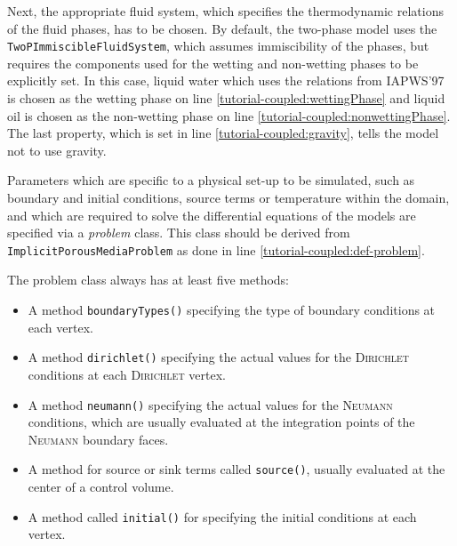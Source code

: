 Next, the appropriate fluid system, which specifies the thermodynamic
relations of the fluid phases, has to be chosen. By default, the
two-phase model uses the \texttt{TwoPImmiscibleFluidSystem}, which
assumes immiscibility of the phases, but requires the components
used for the wetting and non-wetting phases to be explicitly set. In
this case, liquid water which uses the relations from
IAPWS'97~\cite{IAPWS1997} is chosen as the wetting phase on line
\ref{tutorial-coupled:wettingPhase} and liquid oil is chosen as the
non-wetting phase on line \ref{tutorial-coupled:nonwettingPhase}. The
last property, which is set in line \ref{tutorial-coupled:gravity},
tells the model not to use gravity.

\label{tutorial-coupled:boundaryStart}Parameters which are specific to a physical set-up to be simulated,
such as boundary and initial conditions, source terms or temperature
within the domain, and which are required to solve the differential
equations of the models are specified via a \textit{problem} class. This class 
should be derived from \texttt{ImplicitPorousMediaProblem} as done in line
\ref{tutorial-coupled:def-problem}.

The problem class always has at least five methods:
\begin{itemize}
\item A method \texttt{boundaryTypes()} specifying the type of
  boundary conditions at each vertex.
\item A method \texttt{dirichlet()} specifying the actual values for
  the \textsc{Dirichlet} conditions at each \textsc{Dirichlet} vertex.
\item A method \texttt{neumann()} specifying the actual values for
  the \textsc{Neumann} conditions, which are usually evaluated at the 
  integration points of the \textsc{Neumann} boundary faces.
\item A method for source or sink terms called \texttt{source()}, usually evaluated at
  the center of a control volume.
\item A method called \texttt{initial()} for specifying the initial
  conditions at each vertex.
\end{itemize}


